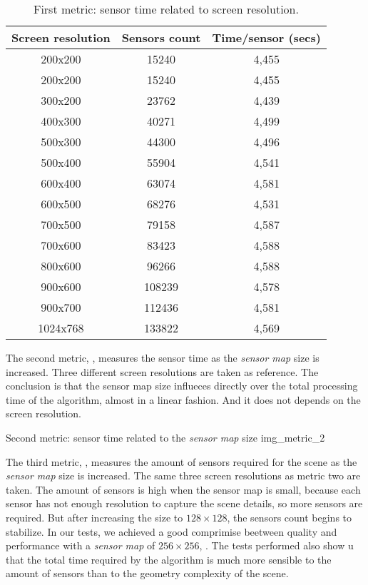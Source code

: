 \documentclass[10pt, conference]{IEEEtran}
\begin{document}
\begin{table}
	\caption{First metric: sensor time related to screen resolution.}
	\label{tab:metric_1}
	\centering
	\begin{tabular}{c|c|c}
		\multicolumn{1}{c}{\bf Screen resolution} &
		\multicolumn{1}{c|}{\bf Sensors count} &
		\multicolumn{1}{c}{\bf  Time/sensor (secs)} \\
		\hline
		200x200	&  15240 & 4,455 \\
		200x200 & 15240 & 4,455 \\
		300x200 & 23762 & 4,439\\
		400x300 & 40271 & 4,499 \\
		500x300 & 44300 & 4,496 \\
		500x400 & 55904 & 4,541 \\
		600x400 & 63074 & 4,581 \\
		600x500 & 68276 & 4,531 \\
		700x500 & 79158 & 4,587 \\
		700x600 & 83423 & 4,588 \\
		800x600 & 96266 & 4,588 \\
		900x600 & 108239 & 4,578 \\
		900x700 & 112436 & 4,581 \\
		1024x768 & 133822 & 4,569\\
	\end{tabular}
\end{table}

The second metric, , measures the sensor time as the \emph{sensor map} size is increased. 
Three different screen resolutions are taken as reference.
The conclusion is that the sensor map size influeces directly over the total processing time of the algorithm, almost in a linear fashion.
And it does not depends on the screen resolution.

\subimages
	{Second metric: sensor time related to the \emph{sensor map} size}
	{img_metric_2}{
}

The third metric, , measures the amount of sensors required for the scene as the \emph{sensor map} size is increased.
The same three screen resolutions as metric two are taken.
The amount of sensors is high when the sensor map is small, because each sensor has not enough resolution to capture the scene details, so more sensors are required.
But after increasing the size to $128 \times 128$, the sensors count begins to stabilize.
In our tests, we achieved a good comprimise beetween quality and performance with a \emph{sensor map} of $256 \times 256$, .
The tests performed also show u that the total time required by the algorithm is much more sensible to the amount of sensors than to the geometry complexity of the scene.\\
\end{document}
